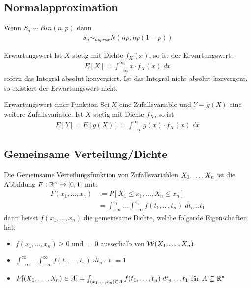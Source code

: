 \subsection{Normalapproximation}
Wenn $S_n \sim Bin (n, p)$ dann
\begin{align*}
  S_n \sim_{approx} N (np, np (1-p))
\end{align*}
\begin{definition}{Erwartungswert}
Ist $X$ stetig mit Dichte $f_X (x)$, so ist der Erwartungswert:
\begin{align*}
  E[X] = \int_{-\infty}^\infty x \cdot f_X (x) \; dx
\end{align*}
sofern das Integral absolut konvergiert. Ist das Integral nicht
absolut konvergent, so existiert der Erwartungswert nicht.
\end{definition}
\begin{definition}{Erwartungswert einer Funktion}
Sei $X$ eine Zufallsvariable und $Y = g (X)$ eine weitere Zufallsvariable. Ist
$X$ stetig mit Dichte $f_X$, so ist
\begin{align*}
  E[Y] = E[g (X)] = \int_{-\infty}^\infty g (x) \cdot f_X (x) \; dx
\end{align*}
\end{definition}

\subsection{Gemeinsame Verteilung/Dichte}
Die Gemeinsame Verteilungsfunktion von Zufallsvariablen $X_1, \dots, X_n$ ist die Abbildung $F: \mathbb{R}^n \mapsto [0, 1]$ mit:
\begin{align*}
  F (x_1, \dots, x_n) & := P[X_1 \leq x_1, \dots, X_n \leq x_n]                                                 \\
                      & = \int_{-\infty}^{x_1} \dots \int_{-\infty}^{x_n} f (t_1, \dots, t_n) \; dt_n \dots t_1
\end{align*}
dann heisst $f (x_1, \dots, x_n)$ die gemeinsame Dichte, welche folgende
Eigenschaften hat:
\begin{itemize}
  \item $f (x_1, \dots, x_n) \geq 0$ und $= 0$ ausserhalb von $\mathcal{W} (X_1, \dots, X_n)$.
  \item $\int_{-\infty}^\infty \dots \int_{-\infty}^\infty f (t_1, \dots, t_n) \; dt_n \dots t_1 = 1$
  \item $P[ (X_1, \dots, X_n) \in A] = \int_{ (x_1, \dots, x_n) \in A} f (t_1, \dots, t_n) \; dt_n \dots t_1$ für $A \subseteq \mathbb{R}^n$
\end{itemize}

